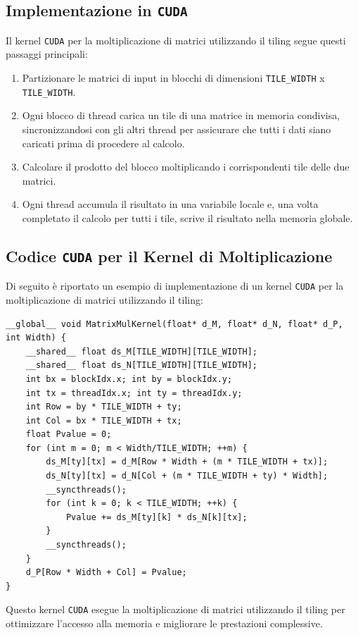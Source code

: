 \subsection{Implementazione in \texttt{CUDA}}
Il kernel \texttt{CUDA} per la moltiplicazione di matrici utilizzando il
tiling segue questi passaggi principali:
\begin{enumerate}
    \item Partizionare le matrici di input in blocchi di dimensioni
    \texttt{TILE\_WIDTH} x \texttt{TILE\_WIDTH}.
    \item Ogni blocco di thread carica un tile di una matrice in memoria condivisa,
    sincronizzandosi con gli altri thread per assicurare che tutti i dati siano
    caricati prima di procedere al calcolo.
    \item Calcolare il prodotto del blocco moltiplicando i corrispondenti tile delle
    due matrici.
    \item Ogni thread accumula il risultato in una variabile locale e, una volta
    completato il calcolo per tutti i tile, scrive il risultato nella memoria globale.
\end{enumerate}

\subsection{Codice \texttt{CUDA} per il Kernel di Moltiplicazione}
Di seguito è riportato un esempio di implementazione di un kernel \texttt{CUDA}
per la moltiplicazione di matrici utilizzando il tiling:

\begin{lstlisting}
__global__ void MatrixMulKernel(float* d_M, float* d_N, float* d_P, int Width) {
    __shared__ float ds_M[TILE_WIDTH][TILE_WIDTH];
    __shared__ float ds_N[TILE_WIDTH][TILE_WIDTH];
    int bx = blockIdx.x; int by = blockIdx.y;
    int tx = threadIdx.x; int ty = threadIdx.y;
    int Row = by * TILE_WIDTH + ty;
    int Col = bx * TILE_WIDTH + tx;
    float Pvalue = 0;
    for (int m = 0; m < Width/TILE_WIDTH; ++m) {
        ds_M[ty][tx] = d_M[Row * Width + (m * TILE_WIDTH + tx)];
        ds_N[ty][tx] = d_N[Col + (m * TILE_WIDTH + ty) * Width];
        __syncthreads();
        for (int k = 0; k < TILE_WIDTH; ++k) {
            Pvalue += ds_M[ty][k] * ds_N[k][tx];
        }
        __syncthreads();
    }
    d_P[Row * Width + Col] = Pvalue;
}
\end{lstlisting}

Questo kernel \texttt{CUDA} esegue la moltiplicazione di matrici utilizzando il tiling
per ottimizzare l'accesso alla memoria e migliorare le prestazioni complessive.

